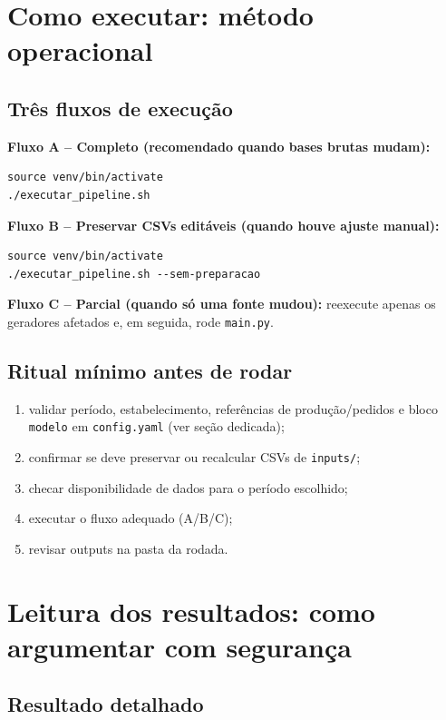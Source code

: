\documentclass[11pt,a4paper]{article}
\begin{document}
\section{Como executar: método operacional}
\label{sec:como-executar}

\subsection{Três fluxos de execução}

\textbf{Fluxo A -- Completo (recomendado quando bases brutas mudam):}
\begin{verbatim}
source venv/bin/activate
./executar_pipeline.sh
\end{verbatim}

\textbf{Fluxo B -- Preservar CSVs editáveis (quando houve ajuste manual):}
\begin{verbatim}
source venv/bin/activate
./executar_pipeline.sh --sem-preparacao
\end{verbatim}

\textbf{Fluxo C -- Parcial (quando só uma fonte mudou):}
reexecute apenas os geradores afetados e, em seguida, rode \texttt{main.py}.

\subsection{Ritual mínimo antes de rodar}

\begin{enumerate}[leftmargin=1.2cm]
    \item validar período, estabelecimento, referências de produção/pedidos e bloco
    \texttt{modelo} em \texttt{config.yaml} (ver seção dedicada);
    \item confirmar se deve preservar ou recalcular CSVs de \texttt{inputs/};
    \item checar disponibilidade de dados para o período escolhido;
    \item executar o fluxo adequado (A/B/C);
    \item revisar outputs na pasta da rodada.
\end{enumerate}

\section{Leitura dos resultados: como argumentar com segurança}
\label{sec:leitura-resultados}

\subsection{Resultado detalhado}
\end{document}

